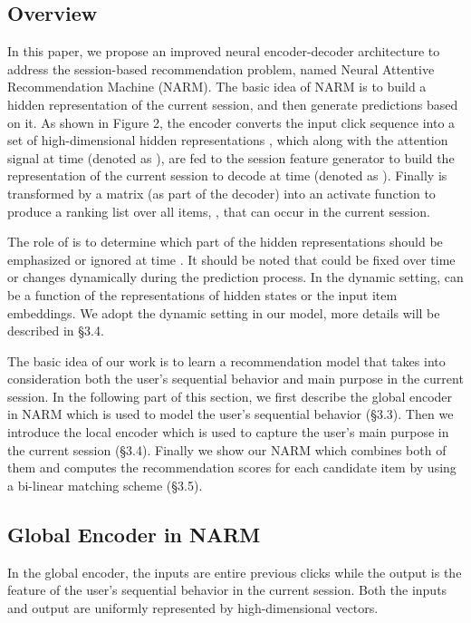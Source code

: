 \documentclass[sigconf]{acmart}
\begin{document}
\subsection{Overview}
In this paper, we propose an improved neural encoder-decoder architecture \cite{shang2015neural,ren2017leveraging} to address the session-based recommendation problem, named Neural Attentive Recommendation Machine (NARM). The basic idea of NARM is to build a hidden representation of the current session, and then generate predictions based on it. As shown in Figure 2, the encoder converts the input click sequence  into a set of high-dimensional hidden representations , which along with the attention signal at time  (denoted as ), are fed to the session feature generator to build the representation of the current session to decode at time  (denoted as ). Finally  is transformed by a matrix  (as part of the decoder) into an activate function to produce a ranking list over all items, , that can occur in the current session.
    
The role of  is to determine which part of the hidden representations should be emphasized or ignored at time . It should be noted that  could be fixed over time or changes dynamically during the prediction process. In the dynamic setting,  can be a function of the representations of hidden states or the input item embeddings. We adopt the dynamic setting in our model, more details will be described in \S 3.4.
  
The basic idea of our work is to learn a recommendation model that takes into consideration both the user's sequential behavior and main purpose in the current session. In the following part of this section, we first describe the global encoder in NARM which is used to model the user's sequential behavior (\S 3.3). Then we introduce the local encoder which is used to capture the user's main purpose in the current session (\S 3.4). Finally we show our NARM which combines both of them and computes the recommendation scores for each candidate item by using a bi-linear matching scheme (\S 3.5).
    
\subsection{Global Encoder in NARM}
In the global encoder, the inputs are entire previous clicks while the output is the feature of the user's sequential behavior in the current session. Both the inputs and output are uniformly represented by high-dimensional vectors.
  
\end{document}
